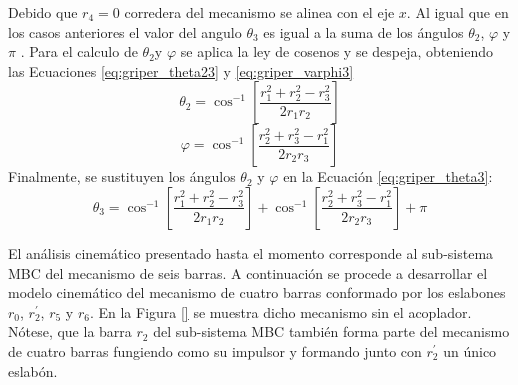 \begin{enumerate}
Debido que $r_4 = 0$ corredera del mecanismo se alinea con el eje $x$. Al igual que en los casos anteriores el valor del angulo $\theta_3$ es igual a la suma de los ángulos $\theta_2$, $\varphi$ y $\pi$ . Para el calculo de $\theta_2$y $\varphi$ se aplica la ley de cosenos y se despeja, obteniendo las Ecuaciones \ref{eq:griper_theta23} y \ref{eq:griper_varphi3}
\begin{equation}\label{eq:griper_theta23}
\theta_2=\cos^{-1}\left[ \frac{r^2_1 +r^2_2-r^2_3}{2r_1r_2}\right]
\end{equation}
\begin{equation}\label{eq:griper_varphi3}
\varphi=\cos^{-1}\left[ \frac{r^2_2 +r^2_3-r^2_1}{2r_2r_3}\right]
\end{equation}
Finalmente, se sustituyen los ángulos $\theta_2$ y $\varphi$  en la Ecuación \ref{eq:griper_theta3}:
\begin{equation}\label{eq:griper_theta33}
\theta_3=\cos^{-1}\left[ \frac{r^2_1 +r^2_2-r^2_3}{2r_1r_2}\right]+\cos^{-1}\left[ \frac{r^2_2 +r^2_3-r^2_1}{2r_2r_3}\right]+\pi
\end{equation}

\end{enumerate}
El análisis cinemático presentado hasta el momento corresponde al sub-sistema MBC del mecanismo de seis barras. A continuación se procede a  desarrollar el modelo cinemático del mecanismo de cuatro barras conformado por los eslabones $r_0$, $r^{\prime}_2$, $r_5$ y $r_6$. En la Figura \ref{} se muestra dicho mecanismo sin el acoplador. Nótese, que la barra $r_2$ del sub-sistema MBC también forma parte del mecanismo de cuatro barras fungiendo como su impulsor y formando junto con $r^{\prime}_2$ un único eslabón.

